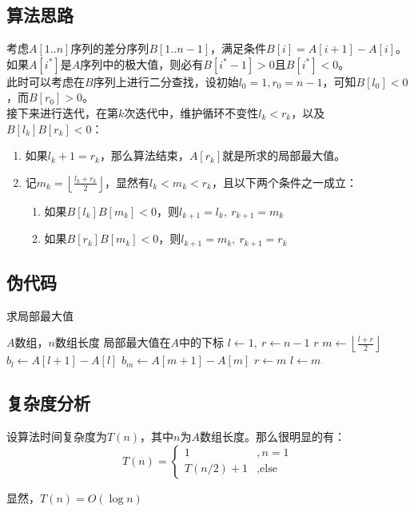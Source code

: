 \documentclass[UTF8]{ctexart}
\begin{document}
\subsection*{算法思路}
考虑$A[1..n]$序列的差分序列$B[1..n-1]$，满足条件$B[i] = A[i+1] - A[i]$。 \\
如果$A[i^*]$是$A$序列中的极大值，则必有$B[i^*-1] > 0$且$B[i^*] < 0$。 \\
此时可以考虑在$B$序列上进行二分查找，设初始$l_0=1, r_0=n-1$，可知$B[l_0]<0$，而$B[r_0]>0$。 \\
接下来进行迭代，在第$k$次迭代中，维护循环不变性$l_k < r_k$，以及$B[l_k]B[r_k] < 0$：
\begin{enumerate}
    \item 如果$l_k+1=r_k$，那么算法结束，$A[r_k]$就是所求的局部最大值。
    \item 记$m_k = \left\lfloor\frac{l_k+r_k}{2}\right\rfloor$，显然有$l_k < m_k < r_k$，且以下两个条件之一成立：
        \begin{enumerate}
            \item 如果$B[l_k]B[m_k] < 0$，则$l_{k+1} = l_k,\ r_{k+1} = m_k$
            \item 如果$B[r_k]B[m_k] < 0$，则$l_{k+1} = m_k,\ r_{k+1} = r_k$
        \end{enumerate}
\end{enumerate}

\subsection*{伪代码}
\begin{algorithm}
    \caption{求局部最大值}
    \begin{algorithmic}[1]
        \Require $A$数组，$n$数组长度
        \Ensure 局部最大值在$A$中的下标
            \State $l\gets 1,\ r\gets n-1$
                    \State \Return $r$
                \Else
                    \State $m\gets \left\lfloor\frac{l+r}{2}\right\rfloor$
                    \State $b_l \gets A[l+1]-A[l]$
                    \State $b_m \gets A[m+1]-A[m]$
                        \State $r \gets m$
                    \Else
                        \State $l \gets m$
                    \EndIf
                \EndIf
            \EndWhile
        \EndFunction
    \end{algorithmic}
\end{algorithm}

\subsection*{复杂度分析}
设算法时间复杂度为$T(n)$，其中$n$为$A$数组长度。那么很明显的有：
\begin{equation*}
    T(n) = 
    \begin{cases}
        1 &, n=1 \\
        T(n/2) + 1 &, \text{else}
    \end{cases}
\end{equation*}

显然，$T(n) = O(\log n)$

\section{}
\end{document}
